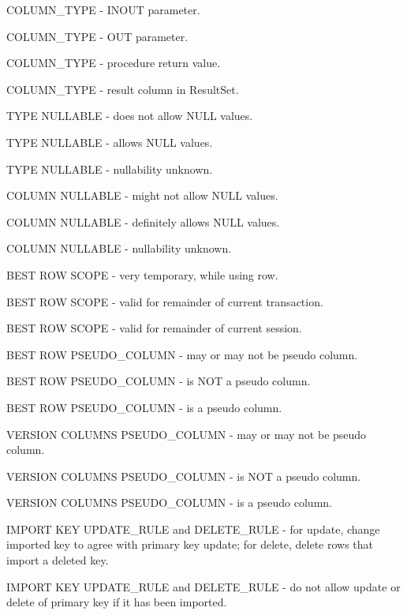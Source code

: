 COLUMN\_TYPE - INOUT parameter. 

COLUMN\_TYPE - OUT parameter. 

COLUMN\_TYPE - procedure return value. 

COLUMN\_TYPE - result column in ResultSet. 

TYPE NULLABLE - does not allow NULL values. 

TYPE NULLABLE - allows NULL values. 

TYPE NULLABLE - nullability unknown. 

COLUMN NULLABLE - might not allow NULL values. 

COLUMN NULLABLE - definitely allows NULL values. 

COLUMN NULLABLE - nullability unknown. 

BEST ROW SCOPE - very temporary, while using row. 

BEST ROW SCOPE - valid for remainder of current transaction. 

BEST ROW SCOPE - valid for remainder of current session. 

BEST ROW PSEUDO\_COLUMN - may or may not be pseudo column. 

BEST ROW PSEUDO\_COLUMN - is NOT a pseudo column. 

BEST ROW PSEUDO\_COLUMN - is a pseudo column. 

VERSION COLUMNS PSEUDO\_COLUMN - may or may not be pseudo column. 

VERSION COLUMNS PSEUDO\_COLUMN - is NOT a pseudo column. 

VERSION COLUMNS PSEUDO\_COLUMN - is a pseudo column. 

IMPORT KEY UPDATE\_RULE and DELETE\_RULE - for update, change imported key to agree with primary key update; for delete, delete rows that import a deleted key. 

IMPORT KEY UPDATE\_RULE and DELETE\_RULE - do not allow update or delete of primary key if it has been imported. 

